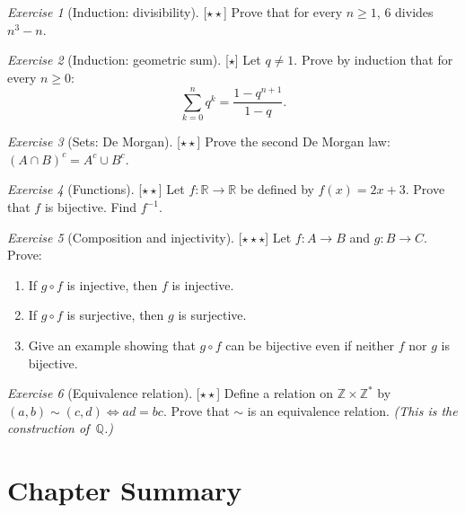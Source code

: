 \documentclass[12pt,a4paper,openany]{book}
\newcommand{\Z}{\mathbb{Z}}
\newcommand{\Q}{\mathbb{Q}}
\newcommand{\R}{\mathbb{R}}
\theoremstyle{definition}
\theoremstyle{remark}
\newtheorem{exercise}{Exercise}[chapter]
\newcommand{\easy}{\textnormal{[$\star$]}}
\newcommand{\medium}{\textnormal{[$\star\star$]}}
\newcommand{\hard}{\textnormal{[$\star\star\star$]}}
\begin{document}
\begin{exercise}[Induction: divisibility]\label{exo:ind-div}\medium
Prove that for every $n \geq 1$, $6$ divides $n^3 - n$.
\end{exercise}

\begin{exercise}[Induction: geometric sum]\label{exo:ind-geom}\easy
Let $q \neq 1$.  Prove by induction that for every $n \geq 0$:
\[
  \sum_{k=0}^{n} q^k = \frac{1 - q^{n+1}}{1-q}.
\]
\end{exercise}

\begin{exercise}[Sets: De Morgan]\label{exo:demorgan2}\medium
Prove the second De Morgan law: $(A \cap B)^c = A^c \cup B^c$.
\end{exercise}

\begin{exercise}[Functions]\label{exo:injection}\medium
Let $f : \R \to \R$ be defined by $f(x) = 2x + 3$.  Prove that $f$ is
bijective.  Find $f^{-1}$.
\end{exercise}

\begin{exercise}[Composition and injectivity]\label{exo:comp-inj}\hard
Let $f : A \to B$ and $g : B \to C$.  Prove:
\begin{enumerate}[label=(\alph*)]
  \item If $g \circ f$ is injective, then $f$ is injective.
  \item If $g \circ f$ is surjective, then $g$ is surjective.
  \item Give an example showing that $g \circ f$ can be bijective even if
    neither $f$ nor $g$ is bijective.
\end{enumerate}
\end{exercise}

\begin{exercise}[Equivalence relation]\label{exo:equiv-rel}\medium
Define a relation on $\Z \times \Z^*$ by $(a,b) \sim (c,d) \iff ad = bc$.
Prove that $\sim$ is an equivalence relation.  \textit{(This is the
construction of~$\Q$.)}
\end{exercise}

\section*{Chapter Summary}
\end{document}
